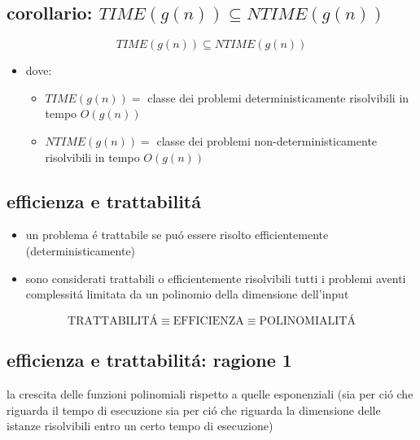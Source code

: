 
\subsection*{corollario: $TIME(g(n))\subseteq NTIME(g(n))$}
\begin{flushleft}
	$$TIME(g(n))\subseteq NTIME(g(n))$$
	\begin{itemize}
		\item dove:
		\begin{itemize}
			\item $TIME(g(n))=$ classe dei problemi deterministicamente risolvibili in tempo $O(g(n))$
			\item $NTIME(g(n))=$ classe dei problemi non-deterministicamente risolvibili in tempo $O(g(n))$
		\end{itemize}
	\end{itemize}
\end{flushleft}


\subsection*{efficienza e trattabilit\'a}
\begin{flushleft}
	\begin{itemize}
		\item un problema \'e trattabile se pu\'o essere risolto efficientemente (deterministicamente)
		\item sono considerati trattabili o efficientemente risolvibili tutti i problemi aventi complessit\'a limitata da un polinomio della dimensione dell'input
	\end{itemize}
	$$\text{TRATTABILIT\'A}\equiv\text{EFFICIENZA}\equiv\text{POLINOMIALIT\'A}$$
\end{flushleft}


\subsection*{efficienza e trattabilit\'a: ragione 1}
\begin{flushleft}
	la crescita delle funzioni polinomiali rispetto a quelle esponenziali (sia per ci\'o che riguarda il tempo di esecuzione sia per ci\'o che riguarda la dimensione delle istanze risolvibili entro un certo tempo di esecuzione)
\end{flushleft}

